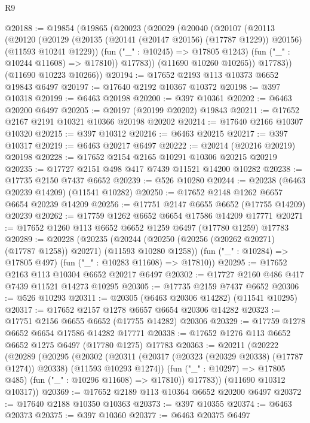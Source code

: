 \begin{lexlean}{R9}
\begin{coremodule}
@20188 := @19854
    (@19865
      (@20023
        (@20029
          (@20040
            (@20107
              (@20113
                (@20120
                  (@20129
                    (@20135 (@20141 (@20147 @20156) (@17787 @1229)) @20156)
                    (@11593 @10241 @1229))
                  (fun ("_" : @10245) => @17805 @1243)
                  (fun ("_" : @10244 @11608) => @17810))
                @17783))
            (@11690 @10260 @10265))
          @17783))
      (@11690 @10223 @10266))
@20194 := @17652 @2193 @113 @10373 @6652 @19843 @6497
@20197 := @17640 @2192 @10367 @10372
@20198 := @397 @10318
@20199 := @6463 @20198
@20200 := @397 @10361
@20202 := @6463 @20200 @6497
@20205 := @20197 (@20199 @20202) @19843
@20211 := @17652 @2167 @2191 @10321 @10366 @20198 @20202
@20214 := @17640 @2166 @10307 @10320
@20215 := @397 @10312
@20216 := @6463 @20215
@20217 := @397 @10317
@20219 := @6463 @20217 @6497
@20222 := @20214 (@20216 @20219) @20198
@20228 := @17652 @2154 @2165 @10291 @10306 @20215 @20219
@20235 := @17727 @2151 @498 @417 @7439 @11521 @14200 @10282
@20238 := @17735 @2150 @7437 @6652
@20239 := @526 @10280
@20244 := @20238 (@6463 @20239 @14209) (@11541 @10282)
@20250 := @17652 @2148 @1262 @6657 @6654 @20239 @14209
@20256 := @17751 @2147 @6655 @6652 (@17755 @14209) @20239
@20262 := @17759 @1262 @6652 @6654 @17586 @14209 @17771
@20271 := @17652 @1260 @113 @6652 @6652 @1259 @6497 (@17780 @1259) @17783
@20289 := @20228
    (@20235
      (@20244 (@20250 (@20256 (@20262 @20271) (@17787 @1258)) @20271) (@11593 @10280 @1258))
      (fun ("_" : @10284) => @17805 @497)
      (fun ("_" : @10283 @11608) => @17810))
@20295 := @17652 @2163 @113 @10304 @6652 @20217 @6497
@20302 := @17727 @2160 @486 @417 @7439 @11521 @14273 @10295
@20305 := @17735 @2159 @7437 @6652
@20306 := @526 @10293
@20311 := @20305 (@6463 @20306 @14282) (@11541 @10295)
@20317 := @17652 @2157 @1278 @6657 @6654 @20306 @14282
@20323 := @17751 @2156 @6655 @6652 (@17755 @14282) @20306
@20329 := @17759 @1278 @6652 @6654 @17586 @14282 @17771
@20338 := @17652 @1276 @113 @6652 @6652 @1275 @6497 (@17780 @1275) @17783
@20363 := @20211
    (@20222
      (@20289
        (@20295
          (@20302
            (@20311 (@20317 (@20323 (@20329 @20338) (@17787 @1274)) @20338) (@11593 @10293 @1274))
            (fun ("_" : @10297) => @17805 @485)
            (fun ("_" : @10296 @11608) => @17810))
          @17783))
      (@11690 @10312 @10317))
@20369 := @17652 @2189 @113 @10364 @6652 @20200 @6497
@20372 := @17640 @2188 @10350 @10363
@20373 := @397 @10355
@20374 := @6463 @20373
@20375 := @397 @10360
@20377 := @6463 @20375 @6497

\end{coremodule}
\end{lexlean}
